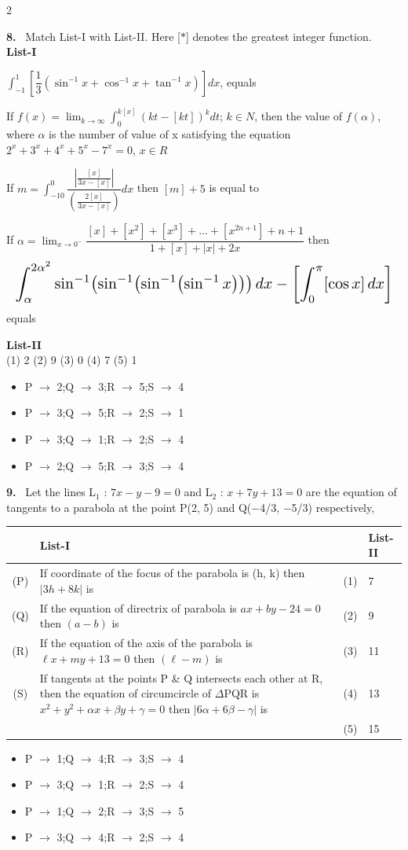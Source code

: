 \documentclass[10pt]{extarticle}
\newcommand{\qn}[1]{\par\smallskip\noindent\textbf{#1.}~}
\newenvironment{qoptions}{\begin{itemize}[leftmargin=1.8em,itemsep=1pt,topsep=2pt,label={}]}{\end{itemize}}
\newcommand{\opt}[2]{\item[(#1)] #2}
\begin{document}
\begin{multicols}{2}
\qn{8} Match List-I with List-II. Here [$*$] denotes the greatest integer function.\\
\textbf{List-I}
\begin{description}[leftmargin=1.8em,itemsep=2pt,topsep=2pt,labelwidth=1.6em]
\item[(P)] $\displaystyle\int_{-1}^{1}\left[\dfrac13\left(\sin^{-1}x+\cos^{-1}x+\tan^{-1}x\right)\right]dx$, equals
\item[(Q)] If $f(x)=\displaystyle\lim_{k\to\infty}\int_0^{k[x]}(kt-[kt])^k dt$; $k\in N$, then the value of $f(\alpha)$, where $\alpha$ is the number of value of x satisfying the equation $2^x+3^x+4^x+5^x-7^x=0$, $x\in R$
\item[(R)] If $m=\displaystyle\int_{-10}^{0}\dfrac{\left|\frac{[x]}{3x-[x]}\right|}{\left(\frac{2[x]}{3x-[x]}\right)}dx$ then $[m]+5$ is equal to
\item[(S)] If $\alpha=\displaystyle\lim_{x\to0^-}\dfrac{[x]+[x^2]+[x^3]+\dots+[x^{2n+1}]+n+1}{1+[x]+|x|+2x}$ then
\[\resizebox{\linewidth}{!}{$\displaystyle\int_\alpha^{2\alpha^2}\sin^{-1}\!\left(\sin^{-1}\!\left(\sin^{-1}\!\left(\sin^{-1}x\right)\right)\right)dx-\left[\int_0^\pi[\cos x]\,dx\right]$}\]
equals
\end{description}
\textbf{List-II}\\
(1) 2 \quad (2) 9 \quad (3) 0 \quad (4) 7 \quad (5) 1
\begin{qoptions}
\opt{A}{P $\to$ 2;Q $\to$ 3;R $\to$ 5;S $\to$ 4}
\opt{B}{P $\to$ 3;Q $\to$ 5;R $\to$ 2;S $\to$ 1}
\opt{C}{P $\to$ 3;Q $\to$ 1;R $\to$ 2;S $\to$ 4}
\opt{D}{P $\to$ 2;Q $\to$ 5;R $\to$ 3;S $\to$ 4}
\end{qoptions}

\qn{9} Let the lines L$_1$ : $7x-y-9=0$ and L$_2$ : $x+7y+13=0$ are the equation of tangents to a parabola at the point P(2, 5) and Q($-$4/3, $-$5/3) respectively,
\begin{center}\small\setlength{\tabcolsep}{3pt}
\begin{tabular}{|c|p{3.0cm}|c|p{1.0cm}|}
\hline
 & \centering List-I & & \centering List-II \tabularnewline
\hline
(P) & If coordinate of the focus of the parabola is (h, k) then $|3h+8k|$ is & (1) & 7 \\
\hline
(Q) & If the equation of directrix of parabola is $ax+by-24=0$ then $(a-b)$ is & (2) & 9 \\
\hline
(R) & If the equation of the axis of the parabola is $\ell x+my+13=0$ then $(\ell-m)$ is & (3) & 11 \\
\hline
(S) & If tangents at the points P \& Q intersects each other at R, then the equation of circumcircle of $\Delta$PQR is $x^2+y^2+\alpha x+\beta y+\gamma=0$ then $|6\alpha+6\beta-\gamma|$ is & (4) & 13 \\
\hline
 & & (5) & 15 \\
\hline
\end{tabular}
\end{center}
\begin{qoptions}
\opt{A}{P $\to$ 1;Q $\to$ 4;R $\to$ 3;S $\to$ 4}
\opt{B}{P $\to$ 3;Q $\to$ 1;R $\to$ 2;S $\to$ 4}
\opt{C}{P $\to$ 1;Q $\to$ 2;R $\to$ 3;S $\to$ 5}
\opt{D}{P $\to$ 3;Q $\to$ 4;R $\to$ 2;S $\to$ 4}
\end{qoptions}


\end{multicols}
\end{document}
